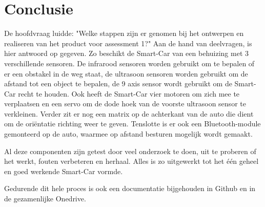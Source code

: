 \section{Conclusie}
De hoofdvraag luidde: "Welke stappen zijn er genomen bij het ontwerpen en realiseren van het product voor assessment 1?"
Aan de hand van deelvragen, is hier antwoord op gegeven. 
Zo beschikt de \gls{Smart-Car} van een behuizing met 3 verschillende sensoren. De infrarood sensoren worden gebruikt om te bepalen of er een obstakel in de weg staat, de ultrasoon sensoren worden gebruikt om de afstand tot een object te bepalen, de 9 axis sensor wordt gebruikt om de \gls{Smart-Car} recht te houden. Ook heeft de \gls{Smart-Car} vier motoren om zich mee te verplaatsen en een servo om de dode hoek van de voorste ultrasoon sensor te verkleinen. Verder zit er nog een matrix op de achterkant van de auto die dient om de oriëntatie richting weer te geven. Tenslotte is er ook een \gls{Bluetooth}-module gemonteerd op de auto, waarmee op afstand besturen mogelijk wordt gemaakt. 

Al deze componenten zijn getest door veel onderzoek te doen, uit te proberen of het werkt, fouten verbeteren en herhaal. Alles is zo uitgewerkt tot het één geheel en goed werkende \gls{Smart-Car} vormde. 

 Gedurende dit hele proces is ook een documentatie bijgehouden in Github en in de gezamenlijke Onedrive. 
